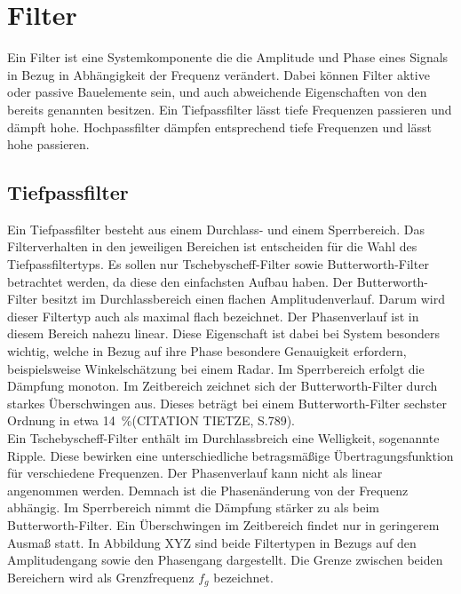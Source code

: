 \section{Filter}
Ein Filter ist eine Systemkomponente die die Amplitude und Phase eines Signals in Bezug in Abhängigkeit der Frequenz verändert. Dabei können Filter aktive oder passive Bauelemente sein, und auch abweichende Eigenschaften von den bereits genannten besitzen. Ein Tiefpassfilter lässt tiefe Frequenzen passieren und dämpft hohe. Hochpassfilter dämpfen entsprechend tiefe Frequenzen und lässt hohe passieren.
\subsection{Tiefpassfilter}
Ein Tiefpassfilter besteht aus einem Durchlass- und einem Sperrbereich. Das Filterverhalten in den jeweiligen Bereichen ist entscheiden für die Wahl des Tiefpassfiltertyps. Es sollen nur Tschebyscheff-Filter sowie Butterworth-Filter betrachtet werden, da diese den einfachsten Aufbau haben. Der Butterworth-Filter besitzt im Durchlassbereich einen flachen Amplitudenverlauf. Darum wird dieser Filtertyp auch als maximal flach bezeichnet. Der Phasenverlauf ist in diesem Bereich nahezu linear. Diese Eigenschaft ist dabei bei System besonders wichtig, welche in Bezug auf ihre Phase besondere Genauigkeit erfordern, beispielsweise Winkelschätzung bei einem Radar. Im Sperrbereich erfolgt die Dämpfung monoton. Im Zeitbereich zeichnet sich der Butterworth-Filter durch starkes Überschwingen aus. Dieses beträgt bei einem Butterworth-Filter sechster Ordnung in etwa \SI{14}{\percent}(CITATION TIETZE, S.789).\\
Ein Tschebyscheff-Filter enthält im Durchlassbreich eine Welligkeit, sogenannte Ripple. Diese bewirken eine unterschiedliche betragsmäßige Übertragungsfunktion für verschiedene Frequenzen. Der Phasenverlauf kann nicht als linear angenommen werden. Demnach ist die Phasenänderung von der Frequenz abhängig. Im Sperrbereich nimmt die Dämpfung stärker zu als beim Butterworth-Filter. Ein Überschwingen im Zeitbereich findet nur in geringerem Ausmaß statt. In Abbildung XYZ sind beide Filtertypen in Bezugs auf den Amplitudengang sowie den Phasengang dargestellt. Die Grenze zwischen beiden Bereichern wird als Grenzfrequenz $f_{g}$ bezeichnet.
